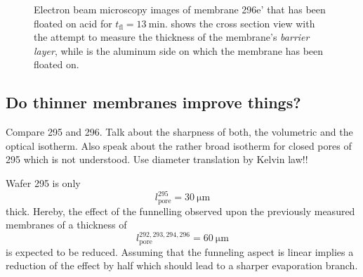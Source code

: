 \documentclass[../thesis.tex]{subfiles}
\begin{document}
              \begin{figure}[htb]
                \centering
                \hfill
                \caption{Electron beam microscopy images of membrane 296e' that has been floated on acid for $t_\mathrm{fl}=\SI{13}{\minute}$. \protect{} shows the cross section view with the attempt to measure the thickness of the membrane's \textit{barrier layer}, while \protect{} is the aluminum side on which the membrane has been floated on.}
                \label{fig:floatin-experiment}
              \end{figure}


        \subsection{Do thinner membranes improve things?}
        \label{subsec:thinner-membranes}

          Compare 295 and 296. Talk about the sharpness of both, the volumetric and the optical isotherm. Also speak about the rather broad isotherm for closed pores of 295 which is not understood. Use diameter translation by Kelvin law!!
          \medskip

          Wafer 295 is only
          \begin{equation}
              l^{295}_\mathrm{pore}=\SI{30}{\micro\meter}
          \end{equation}
          thick. Hereby, the effect of the funnelling observed upon the previously measured membranes of a thickness of
          \begin{equation}
              l^{292,293,294,296}_\mathrm{pore}=\SI{60}{\micro\meter}
          \end{equation}
          is expected to be reduced. Assuming that the funneling aspect is linear implies a reduction of the effect by half which should lead to a sharper evaporation branch.
\end{document}
